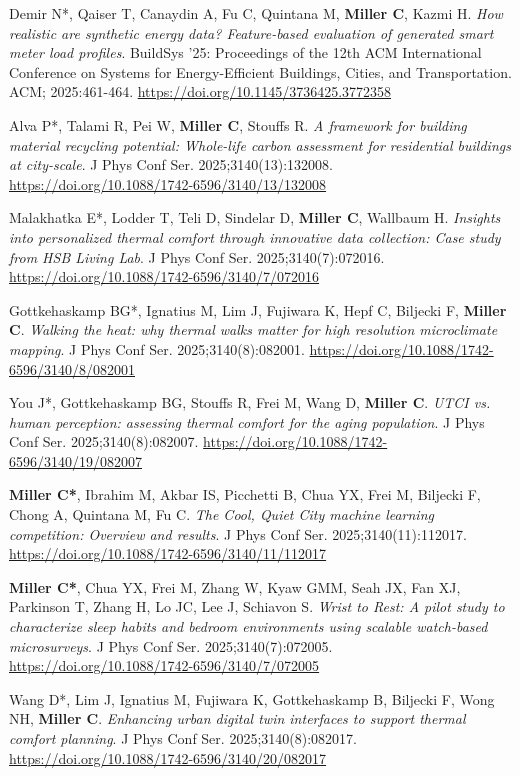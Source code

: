 \documentclass[10pt,a4paper]{article}
\begin{document}
\begin{small}
\begin{etaremune}
\item 
Demir N*, Qaiser T, Canaydin A, Fu C, Quintana M, \textbf{Miller C}, Kazmi H. \emph{How realistic are synthetic energy data? Feature-based evaluation of generated smart meter load profiles}. BuildSys '25: Proceedings of the 12th ACM International Conference on Systems for Energy-Efficient Buildings, Cities, and Transportation. ACM; 2025:461-464. \url{https://doi.org/10.1145/3736425.3772358}
\item 
Alva P*, Talami R, Pei W, \textbf{Miller C}, Stouffs R. \emph{A framework for building material recycling potential: Whole-life carbon assessment for residential buildings at city-scale}. J Phys Conf Ser. 2025;3140(13):132008. \url{https://doi.org/10.1088/1742-6596/3140/13/132008}
\item 
Malakhatka E*, Lodder T, Teli D, Sindelar D, \textbf{Miller C}, Wallbaum H. \emph{Insights into personalized thermal comfort through innovative data collection: Case study from HSB Living Lab}. J Phys Conf Ser. 2025;3140(7):072016. \url{https://doi.org/10.1088/1742-6596/3140/7/072016}
\item 
Gottkehaskamp BG*, Ignatius M, Lim J, Fujiwara K, Hepf C, Biljecki F, \textbf{Miller C}. \emph{Walking the heat: why thermal walks matter for high resolution microclimate mapping}. J Phys Conf Ser. 2025;3140(8):082001. \url{https://doi.org/10.1088/1742-6596/3140/8/082001}
\item 
You J*, Gottkehaskamp BG, Stouffs R, Frei M, Wang D, \textbf{Miller C}. \emph{UTCI vs. human perception: assessing thermal comfort for the aging population}. J Phys Conf Ser. 2025;3140(8):082007. \url{https://doi.org/10.1088/1742-6596/3140/19/082007}
\item 
\textbf{Miller C*}, Ibrahim M, Akbar IS, Picchetti B, Chua YX, Frei M, Biljecki F, Chong A, Quintana M, Fu C. \emph{The Cool, Quiet City machine learning competition: Overview and results}. J Phys Conf Ser. 2025;3140(11):112017. \url{https://doi.org/10.1088/1742-6596/3140/11/112017}
\item 
\textbf{Miller C*}, Chua YX, Frei M, Zhang W, Kyaw GMM, Seah JX, Fan XJ, Parkinson T, Zhang H, Lo JC, Lee J, Schiavon S. \emph{Wrist to Rest: A pilot study to characterize sleep habits and bedroom environments using scalable watch-based microsurveys}. J Phys Conf Ser. 2025;3140(7):072005. \url{https://doi.org/10.1088/1742-6596/3140/7/072005}
\item 
Wang D*, Lim J, Ignatius M, Fujiwara K, Gottkehaskamp B, Biljecki F, Wong NH, \textbf{Miller C}. \emph{Enhancing urban digital twin interfaces to support thermal comfort planning}. J Phys Conf Ser. 2025;3140(8):082017. \url{https://doi.org/10.1088/1742-6596/3140/20/082017}

\end{etaremune}
\end{small}
\end{document}
